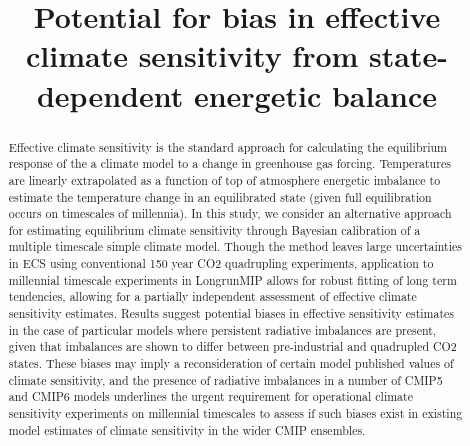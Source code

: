 \documentclass[esd, article]{copernicus}
\begin{document}
\title{Potential for bias in effective climate sensitivity from state-dependent energetic balance}















\received{}
\pubdiscuss{} %
\revised{}
\accepted{}
\published{}




\maketitle



\begin{abstract}
Effective climate sensitivity is the standard approach for calculating the equilibrium response of the a climate model to a change in greenhouse gas forcing.  Temperatures are linearly extrapolated as a function of top of atmosphere energetic imbalance to estimate the temperature change in an equilibrated state (given full equilibration occurs on timescales of millennia).   In this study, we consider an alternative approach for estimating equilibrium climate sensitivity through Bayesian calibration of a multiple timescale simple climate model.  Though the method leaves large uncertainties in ECS using conventional 150 year CO2 quadrupling experiments, application to millennial timescale experiments in LongrunMIP allows for robust fitting of long term tendencies, allowing for a partially independent assessment of effective climate sensitivity estimates.  Results suggest potential biases in effective sensitivity estimates in the case of particular models where persistent radiative imbalances are present, given that imbalances are shown to differ between pre-industrial and quadrupled CO2 states.  These biases may imply a reconsideration of certain model published values of climate sensitivity, and the presence of radiative imbalances in a number of CMIP5 and CMIP6 models underlines the urgent requirement for operational climate sensitivity experiments on millennial timescales to assess if such biases exist in existing model estimates of climate sensitivity in the wider CMIP ensembles. 
\end{abstract}
\end{document}
